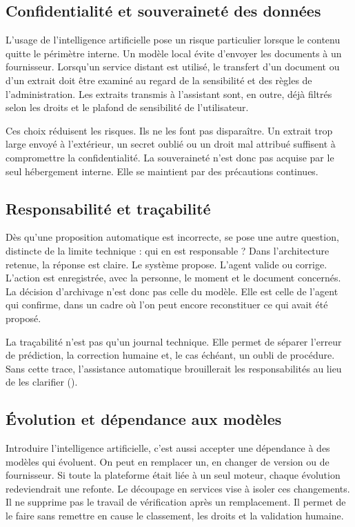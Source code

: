 \subsection{Confidentialité et souveraineté des données}

L'usage de l'intelligence artificielle pose un risque particulier lorsque le contenu quitte le périmètre interne. Un modèle local évite d'envoyer les documents à un fournisseur. Lorsqu'un service distant est utilisé, le transfert d'un document ou d'un extrait doit être examiné au regard de la sensibilité et des règles de l'administration. Les extraits transmis à l'assistant sont, en outre, déjà filtrés selon les droits et le plafond de sensibilité de l'utilisateur.

Ces choix réduisent les risques. Ils ne les font pas disparaître. Un extrait trop large envoyé à l'extérieur, un secret oublié ou un droit mal attribué suffisent à compromettre la confidentialité. La souveraineté n'est donc pas acquise par le seul hébergement interne. Elle se maintient par des précautions continues.

\subsection{Responsabilité et traçabilité}

Dès qu'une proposition automatique est incorrecte, se pose une autre question, distincte de la limite technique : qui en est responsable ? Dans l'architecture retenue, la réponse est claire. Le système propose. L'agent valide ou corrige. L'action est enregistrée, avec la personne, le moment et le document concernés. La décision d'archivage n'est donc pas celle du modèle. Elle est celle de l'agent qui confirme, dans un cadre où l'on peut encore reconstituer ce qui avait été proposé.

La traçabilité n'est pas qu'un journal technique. Elle permet de séparer l'erreur de prédiction, la correction humaine et, le cas échéant, un oubli de procédure. Sans cette trace, l'assistance automatique brouillerait les responsabilités au lieu de les clarifier ().

\subsection{Évolution et dépendance aux modèles}

Introduire l'intelligence artificielle, c'est aussi accepter une dépendance à des modèles qui évoluent. On peut en remplacer un, en changer de version ou de fournisseur. Si toute la plateforme était liée à un seul moteur, chaque évolution redeviendrait une refonte. Le découpage en services vise à isoler ces changements. Il ne supprime pas le travail de vérification après un remplacement. Il permet de le faire sans remettre en cause le classement, les droits et la validation humaine.

